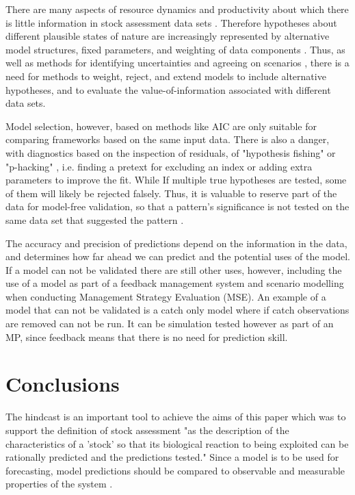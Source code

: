 \documentclass[12pt,halfline,a4paper,nonumbib]{ouparticle}
\begin{document}
There are many aspects of resource dynamics and productivity about which there is little information in stock assessment data sets \parencite[e.g.][]{lee2011m,lee2012steepness, jiao2012modelling,simon2012effects,mangel2013perspective,pepin2015reconsidering,cury2014resolving}. Therefore hypotheses about different plausible states of nature are increasingly represented by alternative model structures, fixed parameters, and weighting of data components \parencite[][]{sharma2020trfmo}. Thus, as well as methods for identifying uncertainties and agreeing on scenarios \parencite{leach2014elicit}, there is a need for methods to weight, reject, and extend models to include alternative hypotheses, and to evaluate the value-of-information associated with different data sets. 

Model selection, however, based on methods like AIC are only suitable for comparing frameworks based on the same input data. There is also a danger, with diagnostics based on the inspection of residuals, of "hypothesis fishing" or "p-hacking" \parencite{wasserstein2016asa,head2015extent}, i.e. finding a pretext for excluding an index or adding extra parameters %
to improve the fit. While If multiple true hypotheses are tested, some of them will likely be rejected falsely. Thus, it is valuable to reserve part of the data for model-free validation, so that a pattern’s significance is not tested on the same data set that suggested the pattern \parencite{arlot2010survey}.


The accuracy and precision of predictions depend on the information in the data, and determines how far ahead we can predict and the potential uses of the model. If a model can not be validated there are still other uses, however, including the use of a model as part of a feedback management system and scenario modelling when conducting Management Strategy Evaluation (MSE). An example of a model that can not be validated is a catch only model where if catch observations are removed can not be run. It can be simulation tested however as part of an MP, since feedback means that there is no need for prediction skill.

\section{Conclusions}

The hindcast is an important tool to achieve the aims of this paper which was to support the definition of stock assessment "as the description of the characteristics of a ’stock’ so that its biological reaction to being exploited can be rationally predicted and the predictions tested." Since a model is to be used for forecasting, model predictions should be compared to observable and measurable properties of the system \parencite{ianelli2016multi}. 
\end{document}
